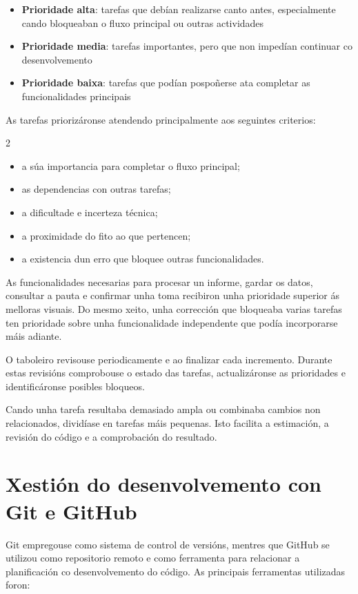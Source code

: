 \begin{itemize}
    \item \textbf{Prioridade alta}: tarefas que debían realizarse canto antes, especialmente cando bloqueaban o fluxo principal ou outras actividades
    \item \textbf{Prioridade media}: tarefas importantes, pero que non impedían continuar co desenvolvemento
    \item \textbf{Prioridade baixa}: tarefas que podían pospoñerse ata completar as funcionalidades principais
\end{itemize}

As tarefas priorizáronse atendendo principalmente aos seguintes criterios:

\begin{multicols}{2}
\begin{itemize}
    \item a súa importancia para completar o fluxo principal;
    \item as dependencias con outras tarefas;
    \item a dificultade e incerteza técnica;
    \item a proximidade do fito ao que pertencen;
    \item a existencia dun erro que bloquee outras funcionalidades.
\end{itemize}
\end{multicols}

As funcionalidades necesarias para procesar un informe, gardar os datos, consultar a pauta e confirmar unha toma recibiron unha prioridade superior ás melloras visuais. Do mesmo xeito, unha corrección que bloqueaba varias tarefas ten prioridade sobre unha funcionalidade independente que podía incorporarse máis adiante.

O taboleiro revisouse periodicamente e ao finalizar cada incremento. Durante estas revisións comprobouse o estado das tarefas, actualizáronse as prioridades e identificáronse posibles bloqueos.

Cando unha tarefa resultaba demasiado ampla ou combinaba cambios non relacionados, dividíase en tarefas máis pequenas. Isto facilita a estimación, a revisión do código e a comprobación do resultado.

\section{Xestión do desenvolvemento con Git e GitHub}

Git empregouse como sistema de control de versións, mentres que GitHub se utilizou como repositorio remoto e como ferramenta para relacionar a planificación co desenvolvemento do código. As principais ferramentas utilizadas foron:

